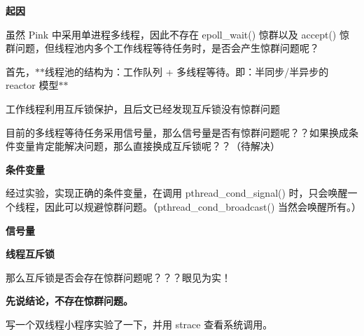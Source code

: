 
\begin{DoxyItemize}
\item {\bfseries 起因}
\end{DoxyItemize}

虽然 Pink 中采用单进程多线程，因此不存在 epoll\+\_\+wait() 惊群以及 accept() 惊群问题，但线程池内多个工作线程等待任务时，是否会产生惊群问题呢？

首先，$\ast$$\ast$线程池的结构为：工作队列 + 多线程等待。即：半同步/半异步的 reactor 模型$\ast$$\ast$


\begin{DoxyEnumerate}
\item 工作线程利用互斥锁保护，且后文已经发现互斥锁没有惊群问题
\item 目前的多线程等待任务采用信号量，那么信号量是否有惊群问题呢？？如果换成条件变量肯定能解决问题，那么直接换成互斥锁呢？？（待解决）
\end{DoxyEnumerate}
\begin{DoxyItemize}
\item {\bfseries 条件变量}
\end{DoxyItemize}

经过实验，实现正确的条件变量，在调用 pthread\+\_\+cond\+\_\+signal() 时，只会唤醒一个线程，因此可以规避惊群问题。（pthread\+\_\+cond\+\_\+broadcast() 当然会唤醒所有。）


\begin{DoxyItemize}
\item {\bfseries 信号量}
\item {\bfseries 线程互斥锁}
\end{DoxyItemize}

那么互斥锁是否会存在惊群问题呢？？？眼见为实！

{\bfseries 先说结论，不存在惊群问题。}

写一个双线程小程序实验了一下，并用 strace 查看系统调用。


